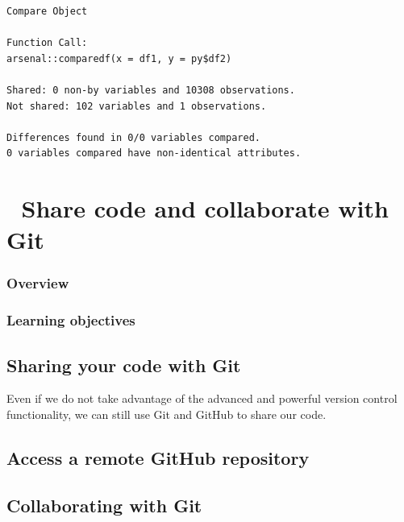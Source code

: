 \documentclass[
  letterpaper,
  DIV=11,
  numbers=noendperiod]{scrreprt}
\begin{document}
\begin{verbatim}
Compare Object

Function Call: 
arsenal::comparedf(x = df1, y = py$df2)

Shared: 0 non-by variables and 10308 observations.
Not shared: 102 variables and 1 observations.

Differences found in 0/0 variables compared.
0 variables compared have non-identical attributes.
\end{verbatim}

\hypertarget{share-code-and-collaborate-with-git}{%
\chapter{\texorpdfstring{{📘} Share code and collaborate with
Git}{📘 Share code and collaborate with Git}}\label{share-code-and-collaborate-with-git}}

\hypertarget{overview-5}{%
\subsection{Overview}\label{overview-5}}

\hypertarget{learning-objectives-6}{%
\subsection{Learning objectives}\label{learning-objectives-6}}

\hypertarget{sharing-your-code-with-git}{%
\section{Sharing your code with Git}\label{sharing-your-code-with-git}}

Even if we do not take advantage of the advanced and powerful version
control functionality, we can still use Git and GitHub to share our
code.

\hypertarget{access-a-remote-github-repository}{%
\section{Access a remote GitHub
repository}\label{access-a-remote-github-repository}}

\hypertarget{collaborating-with-git}{%
\section{Collaborating with Git}\label{collaborating-with-git}}
\end{document}
